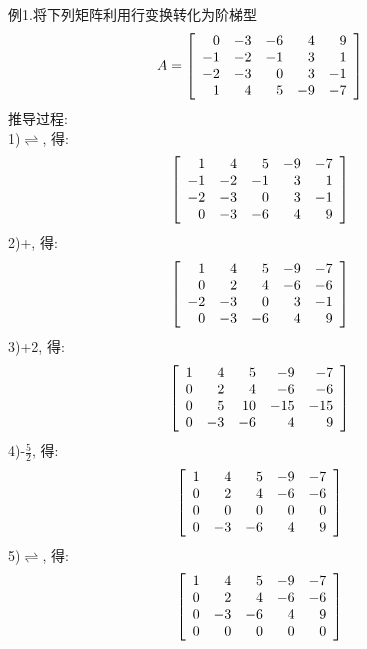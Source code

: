 例1.将下列矩阵利用行变换转化为阶梯型
\[A=\left[
\begin{array}{r r r r r}
	0 & -3 & -6 & 4 & 9\\
	-1 & -2 & -1 & 3 & 1\\
	-2 & -3 & 0 & 3 & -1\\
	1 & 4 & 5 & -9 & -7
\end{array}
\right]\]
推导过程:\\
1)$\rightleftharpoons$, 得:\\
\[\left[
\begin{array}{r r r r r}
	1 & 4 & 5 & -9 & -7\\
	-1 & -2 & -1 & 3 & 1\\
	-2 & -3 & 0 & 3 & -1\\
	0 & -3 & -6 & 4 & 9
\end{array}
\right]\]
2)+, 得:\\
\[\left[
\begin{array}{r r r r r}
	1 & 4 & 5 & -9 & -7\\
	0 & 2 & 4 & -6 & -6\\
	-2 & -3 & 0 & 3 & -1\\
	0 & -3 & -6 & 4 & 9
\end{array}
\right]\]
3)+2, 得:\\
\[\left[
\begin{array}{r r r r r}
	1 & 4 & 5 & -9 & -7\\
	0 & 2 & 4 & -6 & -6\\
	0 & 5 & 10 & -15 & -15\\
	0 & -3 & -6 & 4 & 9
\end{array}
\right]\]
4)-$\frac{5}{2}$, 得:\\
\[\left[
\begin{array}{r r r r r}
	1 & 4 & 5 & -9 & -7\\
	0 & 2 & 4 & -6 & -6\\
	0 & 0 & 0 & 0 & 0\\
	0 & -3 & -6 & 4 & 9
\end{array}
\right]\]
5)$\rightleftharpoons$, 得:\\
\[\left[
\begin{array}{r r r r r}
	1 & 4 & 5 & -9 & -7\\
	0 & 2 & 4 & -6 & -6\\
	0 & -3 & -6 & 4 & 9\\
	0 & 0 & 0 & 0 & 0
\end{array}
\right]\]


